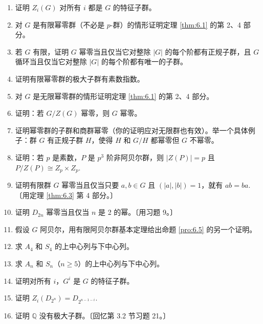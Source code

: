 \begin{enumerate}
\item 证明 \(Z_i(G)\) 对所有 \(i\) 都是 \(G\) 的特征子群。

\item 对 \(G\) 是有限幂零群（不必是 \(p\)-群）的情形证明定理 \ref{thm:6.1} 的第 2、4 部分。

\item 若 \(G\) 有限，证明 \(G\) 幂零当且仅当它对整除 \(|G|\) 的每个阶都有正规子群，且 \(G\) 循环当且仅当它对整除 \(|G|\) 的每个阶都有唯一的子群。

\item 证明有限幂零群的极大子群有素数指数。

\item 对 \(G\) 是无限幂零群的情形证明定理 \ref{thm:6.1} 的第 2、4 部分。

\item 证明：若 \(G/Z(G)\) 幂零，则 \(G\) 幂零。

\item 证明幂零群的子群和商群幂零（你的证明应对无限群也有效）。举一个具体例子：群 \(G\) 有正规子群 \(H\)，使得 \(H\) 和 \(G/H\) 都幂零但 \(G\) 不幂零。

\item 证明：若 \(p\) 是素数，\(P\) 是 \(p^3\) 阶非阿贝尔群，则 \(|Z(P)| = p\) 且 \(P/Z(P) \cong Z_p \times Z_p\).

\item 证明有限群 \(G\) 幂零当且仅当只要 \(a, b \in G\) 且 \((|a|, |b|) = 1\)，就有 \(ab = ba\).〔用定理 \ref{thm:6.3} 第 4 部分。〕

\item 证明 \(D_{2n}\) 幂零当且仅当 \(n\) 是 2 的幂。〔用习题 9。〕

\item 假设 \(G\) 阿贝尔，用有限阿贝尔群基本定理给出命题 \ref{pro:6.5} 的另一个证明。

\item 求 \(A_4\) 和 \(S_4\) 的上中心列与下中心列。

\item 求 \(A_n\) 和 \(S_n\)（\(n \geq 5\)）的上中心列与下中心列。

\item 证明对所有 \(i\)，\(G^i\) 是 \(G\) 的特征子群。

\item 证明 \(Z_i(D_{2^n}) = D_{2^{n-1-i}}\).

\item 证明 \(\mathbb{Q}\) 没有极大子群。〔回忆第 3.2 节习题 21。〕


\end{enumerate}
